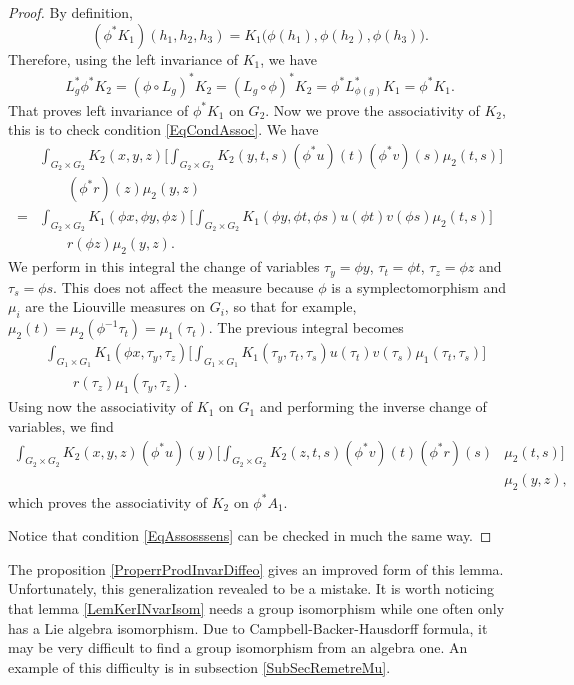 \begin{proof}
By definition,
\[ 
(\phi^*K_1)(h_1,h_2,h_3)=K_1\big( \phi(h_1),\phi(h_2),\phi(h_3)\big).
\]
Therefore, using the left invariance of $K_1$, we have
\[ 
\begin{split}
    L_{g}^*\phi^*K_2=(\phi\circ L_{g})^*K_2=(L_{g}\circ\phi)^*K_2=\phi^*L_{\phi(g)}^*K_1=\phi^*K_1.
\end{split}  
\]
That proves left invariance of $\phi^*K_1$ on $G_{2}$.  Now we prove the associativity of $K_2$, this is to check condition  \eqref{EqCondAssoc}. We have
\[
\begin{split}
 &\int_{G_2\times G_2}K_2(x,y,z)\Bigg[ \int_{G_2\times G_2}K_2(y,t,s)(\phi^*u)(t)(\phi^*v)(s)\mu_2(t,s) \Bigg]\\
&\qquad(\phi^*r)(z)\mu_2(y,z)\\
=&\int_{G_2\times G_2}K_1(\phi x,\phi y,\phi z)\Bigg[  \int_{G_2\times G_2}K_1(\phi y,\phi t,\phi s)u(\phi t)v(\phi s)\mu_2(t,s)  \Bigg]\\
&\qquad r(\phi z)\mu_2(y,z).
\end{split}
\]
We perform in this integral the change of variables $\tau_y=\phi y$, $\tau_t=\phi t$, $\tau_z=\phi z$ and $\tau_s=\phi s$. This does not affect the measure because  $\phi$ is a symplectomorphism and $\mu_i$ are the Liouville measures on $G_i$, so that for example,  $\mu_2(t)=\mu_2(\phi^{-1}\tau_t)=\mu_1(\tau_t)$. The previous integral becomes
\[ 
\begin{split}
  &\int_{G_1\times G_1}K_1(\phi x,\tau_y,\tau_z)\Bigg[  \int_{G_1\times G_1}K_1(\tau_y,\tau_t,\tau_s)u(\tau_t)v(\tau_s)\mu_1(\tau_t,\tau_s)  \Bigg]\\
&\qquad r(\tau_z)\mu_1(\tau_y,\tau_z).
\end{split}
\]
Using now the associativity of $K_1$ on $G_1$ and performing the inverse change of variables, we find
\[ 
\begin{split}
\int_{G_2\times G_2}K_2(x,y,z)(\phi^*u)(y)\Bigg[ \int_{G_2\times G_2}K_2(z,t,s)(\phi^*v)(t)(\phi^*r)(s)&\mu_2(t,s)   \Bigg]\\
                    &\mu_2(y,z),
\end{split}  
\]
which proves the associativity of $K_2$ on $\phi^*A_1$.

Notice that condition \eqref{EqAssosssens} can be checked in much the same way.

\end{proof}

The proposition \ref{ProperrProdInvarDiffeo} gives an improved form of this lemma. Unfortunately, this generalization revealed to be a mistake. It is worth noticing that lemma \ref{LemKerINvarIsom} needs a group isomorphism while one often only has a Lie algebra isomorphism. Due to Campbell-Backer-Hausdorff formula, it may be very difficult to find a group isomorphism from an algebra one. An example of this difficulty is in subsection  \ref{SubSecRemetreMu}.


